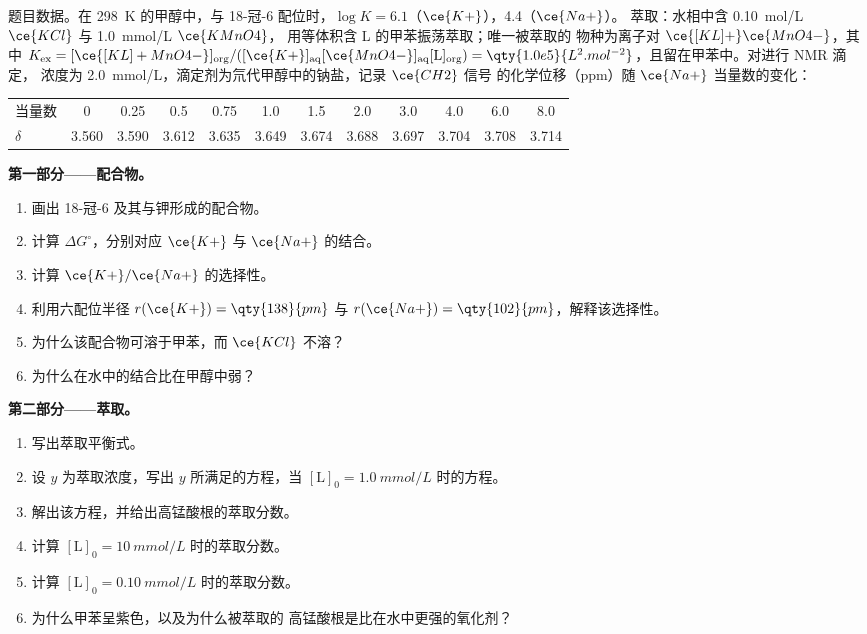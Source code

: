 \begin{problem}
\label{pb:b3:supramolecular:1}
题目数据。在 \qty{298}{K} 的甲醇中，与 18-冠-6 配位时，$\log K = 6.1$（$\ce{K+}$），4.4（$\ce{Na+}$）。
萃取：水相中含 \qty{0.10}{mol/L} $\ce{KCl}$ 与 \qty{1.0}{mmol/L} $\ce{KMnO4}$，
用等体积含 L 的甲苯振荡萃取；唯一被萃取的
物种为离子对 $\ce{[KL]+}\ce{MnO4-}$，其中
$K_{\mathrm{ex}} = [\ce{[KL]+MnO4-}]_{\mathrm{org}}/([\ce{K+}]_{\mathrm{aq}}[\ce{MnO4-}]_{\mathrm{aq}}[\mathrm L]_{\mathrm{org}}) = \qty{1.0e5}{L^2.mol^{-2}}$，且留在甲苯中。对进行 NMR 滴定，
浓度为 \qty{2.0}{mmol/L}，滴定剂为氘代甲醇中的钠盐，记录 $\ce{CH2}$ 信号
的化学位移（ppm）随 $\ce{Na+}$ 当量数的变化：

\begin{center}\small
\begin{tabular}{l*{11}{c}}
\hline
当量数 & 0 & 0.25 & 0.5 & 0.75 & 1.0 & 1.5 & 2.0 & 3.0 & 4.0 & 6.0 & 8.0\\
$\delta$ & 3.560 & 3.590 & 3.612 & 3.635 & 3.649 & 3.674 & 3.688 & 3.697 & 3.704 & 3.708 & 3.714\\
\hline
\end{tabular}
\end{center}

\medskip\noindent\textbf{第一部分——配合物。}
\begin{enumerate}
  \item 画出 18-冠-6 及其与钾形成的配合物。
  \item 计算 $\Delta G^\circ$，分别对应 $\ce{K+}$ 与 $\ce{Na+}$ 的结合。
  \item 计算 $\ce{K+}/\ce{Na+}$ 的选择性。
  \item 利用六配位半径 $r(\ce{K+}) = \qty{138}{pm}$ 与 $r(\ce{Na+}) = \qty{102}{pm}$，解释该选择性。
  \item 为什么该配合物可溶于甲苯，而 $\ce{KCl}$ 不溶？
  \item 为什么在水中的结合比在甲醇中弱？
\end{enumerate}

\medskip\noindent\textbf{第二部分——萃取。}
\begin{enumerate}[resume]
  \item 写出萃取平衡式。
  \item 设 $y$ 为萃取浓度，写出 $y$ 所满足的方程，当
        $[\mathrm L]_0 = \qty{1.0}{mmol/L}$ 时的方程。
  \item 解出该方程，并给出高锰酸根的萃取分数。
  \item 计算 $[\mathrm L]_0 = \qty{10}{mmol/L}$ 时的萃取分数。
  \item 计算 $[\mathrm L]_0 = \qty{0.10}{mmol/L}$ 时的萃取分数。
  \item 为什么甲苯呈紫色，以及为什么被萃取的
        高锰酸根是比在水中更强的氧化剂？
\end{enumerate}


\end{problem}

